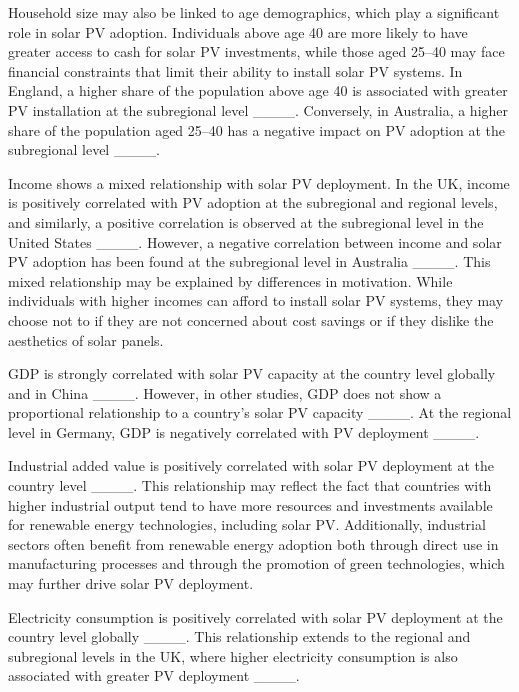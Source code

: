 Household size may also be linked to age demographics, which play a significant role in solar PV adoption. Individuals above age 40 are more likely to have greater access to cash for solar PV investments, while those aged 25–40 may face financial constraints that limit their ability to install solar PV systems. In England, a higher share of the population above age 40 is associated with greater PV installation at the subregional level ____. Conversely, in Australia, a higher share of the population aged 25–40 has a negative impact on PV adoption at the subregional level ____.

Income shows a mixed relationship with solar PV deployment. In the UK, income is positively correlated with PV adoption at the subregional and regional levels, and similarly, a positive correlation is observed at the subregional level in the United States ____. However, a negative correlation between income and solar PV adoption has been found at the subregional level in Australia ____. This mixed relationship may be explained by differences in motivation. While individuals with higher incomes can afford to install solar PV systems, they may choose not to if they are not concerned about cost savings or if they dislike the aesthetics of solar panels.

GDP is strongly correlated with solar PV capacity at the country level globally and in China ____. However, in other studies, GDP does not show a proportional relationship to a country's solar PV capacity ____. At the regional level in Germany, GDP is negatively correlated with PV deployment ____.

Industrial added value is positively correlated with solar PV deployment at the country level ____. This relationship may reflect the fact that countries with higher industrial output tend to have more resources and investments available for renewable energy technologies, including solar PV. Additionally, industrial sectors often benefit from renewable energy adoption both through direct use in manufacturing processes and through the promotion of green technologies, which may further drive solar PV deployment.

Electricity consumption is positively correlated with solar PV deployment at the country level globally ____. This relationship extends to the regional and subregional levels in the UK, where higher electricity consumption is also associated with greater PV deployment ____.

